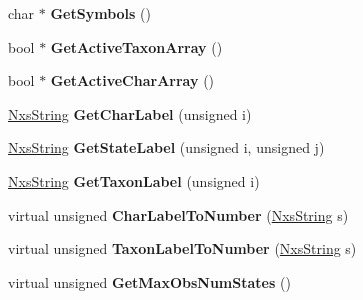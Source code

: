 \begin{DoxyCompactItemize}
\item 
\hypertarget{classNxsCharactersBlock_a43f0fb559f83dad0506074fde144fa1c}{
char $\ast$ {\bfseries GetSymbols} ()}
\label{classNxsCharactersBlock_a43f0fb559f83dad0506074fde144fa1c}

\item 
\hypertarget{classNxsCharactersBlock_ab396aa3b6513467319db9d4ec79b3491}{
bool $\ast$ {\bfseries GetActiveTaxonArray} ()}
\label{classNxsCharactersBlock_ab396aa3b6513467319db9d4ec79b3491}

\item 
\hypertarget{classNxsCharactersBlock_ae4053fcae2b3e2c4717d56a307ff43bc}{
bool $\ast$ {\bfseries GetActiveCharArray} ()}
\label{classNxsCharactersBlock_ae4053fcae2b3e2c4717d56a307ff43bc}

\item 
\hypertarget{classNxsCharactersBlock_a78a05d5817099b1ca757bf2f98d6eee4}{
\hyperlink{classNxsString}{NxsString} {\bfseries GetCharLabel} (unsigned i)}
\label{classNxsCharactersBlock_a78a05d5817099b1ca757bf2f98d6eee4}

\item 
\hypertarget{classNxsCharactersBlock_a97fb878930c0c923f5d5782784f9a30f}{
\hyperlink{classNxsString}{NxsString} {\bfseries GetStateLabel} (unsigned i, unsigned j)}
\label{classNxsCharactersBlock_a97fb878930c0c923f5d5782784f9a30f}

\item 
\hypertarget{classNxsCharactersBlock_a5e3fef4cb87159439657eeaa87915bca}{
\hyperlink{classNxsString}{NxsString} {\bfseries GetTaxonLabel} (unsigned i)}
\label{classNxsCharactersBlock_a5e3fef4cb87159439657eeaa87915bca}

\item 
\hypertarget{classNxsCharactersBlock_a8d74801e350fac497cfe131f42f69827}{
virtual unsigned {\bfseries CharLabelToNumber} (\hyperlink{classNxsString}{NxsString} s)}
\label{classNxsCharactersBlock_a8d74801e350fac497cfe131f42f69827}

\item 
\hypertarget{classNxsCharactersBlock_afbd900762109bd46339bf37f3996a04b}{
virtual unsigned {\bfseries TaxonLabelToNumber} (\hyperlink{classNxsString}{NxsString} s)}
\label{classNxsCharactersBlock_afbd900762109bd46339bf37f3996a04b}

\item 
\hypertarget{classNxsCharactersBlock_a5f69b7cf427afe4b9000bf1c574fc1e5}{
virtual unsigned {\bfseries GetMaxObsNumStates} ()}
\label{classNxsCharactersBlock_a5f69b7cf427afe4b9000bf1c574fc1e5}


\end{DoxyCompactItemize}
